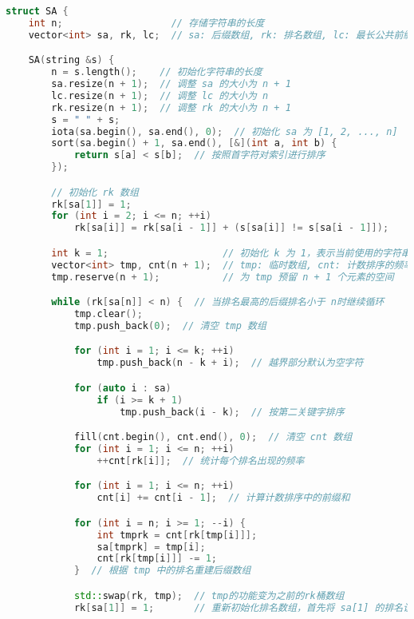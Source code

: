 \begin{lstlisting}[language=C++]
struct SA {
    int n;                   // 存储字符串的长度
    vector<int> sa, rk, lc;  // sa: 后缀数组, rk: 排名数组, lc: 最长公共前缀数组 (LCP)

    SA(string &s) {
        n = s.length();    // 初始化字符串的长度
        sa.resize(n + 1);  // 调整 sa 的大小为 n + 1
        lc.resize(n + 1);  // 调整 lc 的大小为 n
        rk.resize(n + 1);  // 调整 rk 的大小为 n + 1
        s = " " + s;
        iota(sa.begin(), sa.end(), 0);  // 初始化 sa 为 [1, 2, ..., n]
        sort(sa.begin() + 1, sa.end(), [&](int a, int b) {
            return s[a] < s[b];  // 按照首字符对索引进行排序
        });

        // 初始化 rk 数组
        rk[sa[1]] = 1;
        for (int i = 2; i <= n; ++i)
            rk[sa[i]] = rk[sa[i - 1]] + (s[sa[i]] != s[sa[i - 1]]);

        int k = 1;                    // 初始化 k 为 1，表示当前使用的字符串长度
        vector<int> tmp, cnt(n + 1);  // tmp: 临时数组, cnt: 计数排序的频率数组
        tmp.reserve(n + 1);           // 为 tmp 预留 n + 1 个元素的空间

        while (rk[sa[n]] < n) {  // 当排名最高的后缀排名小于 n时继续循环
            tmp.clear();
            tmp.push_back(0);  // 清空 tmp 数组

            for (int i = 1; i <= k; ++i)
                tmp.push_back(n - k + i);  // 越界部分默认为空字符

            for (auto i : sa)
                if (i >= k + 1)
                    tmp.push_back(i - k);  // 按第二关键字排序

            fill(cnt.begin(), cnt.end(), 0);  // 清空 cnt 数组
            for (int i = 1; i <= n; ++i)
                ++cnt[rk[i]];  // 统计每个排名出现的频率

            for (int i = 1; i <= n; ++i)
                cnt[i] += cnt[i - 1];  // 计算计数排序中的前缀和

            for (int i = n; i >= 1; --i) {
                int tmprk = cnt[rk[tmp[i]]];
                sa[tmprk] = tmp[i];
                cnt[rk[tmp[i]]] -= 1;
            }  // 根据 tmp 中的排名重建后缀数组

            std::swap(rk, tmp);  // tmp的功能变为之前的rk桶数组
            rk[sa[1]] = 1;       // 重新初始化排名数组，首先将 sa[1] 的排名设为 1


\end{lstlisting}
